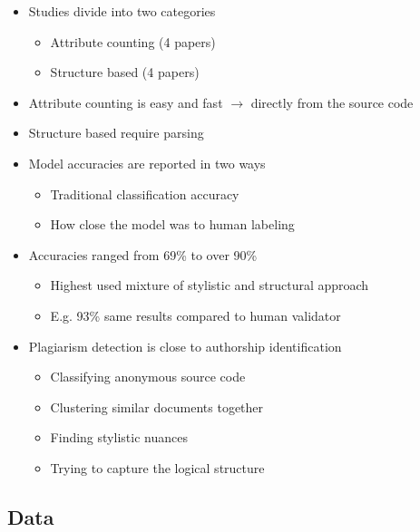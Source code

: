\documentclass[t,12pt,pdftex]{beamer}
\begin{document}
\begin{frame}
	\vspace{0.5in}
	\begin{itemize}
		\item Studies divide into two categories
		\begin{itemize}
			\item Attribute counting (4 papers)
			\item Structure based (4 papers)
		\end{itemize}
		\item Attribute counting is easy and fast $\rightarrow$ directly from the source code
		\item Structure based require parsing
		\item Model accuracies are reported in two ways
		\begin{itemize}
			\item Traditional classification accuracy
			\item How close the model was to human labeling
		\end{itemize}
	\end{itemize}
\end{frame}

\begin{frame}
	\vspace{0.5in}
	\begin{itemize}
		\item Accuracies ranged from 69\% to over 90\%
		\begin{itemize}
			\item Highest used mixture of stylistic and structural approach
			\item E.g. 93\% same results compared to human validator
		\end{itemize}
		\item Plagiarism detection is close to authorship identification
			\begin{itemize}
			\item Classifying anonymous source code
			\item Clustering similar documents together
			\item Finding stylistic nuances
			\item Trying to capture the logical structure
		\end{itemize}
	\end{itemize}
\end{frame}

\subsection{Data}
\end{document}
